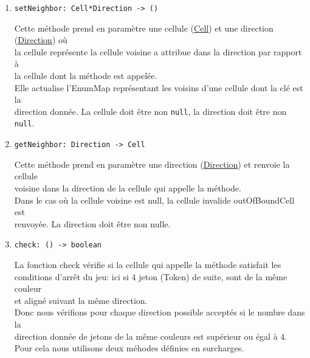 \documentclass[11pt]{article}
\begin{document}
\begin{enumerate}
\item \texttt{setNeighbor: Cell*Direction -> ()} \label{org45c9cd6}
\label{sec:org76b1234}

Cette méthode prend en paramètre une cellule (\hyperref[orgc81d8e8]{Cell}) et une direction (\hyperref[org010dbac]{Direction}) où\\
la cellule représente la cellule voisine a attribue dans la direction par rapport à\\
la cellule dont la méthode est appelée.\\

Elle actualise l'EnumMap représentant les voisins d'une cellule dont la clé est la\\
direction donnée. La cellule doit être non \texttt{null}, la direction doit être non \texttt{null}.\\

\item \texttt{getNeighbor: Direction -> Cell} \label{org48fb67a}
\label{sec:orga799806}

Cette méthode prend en paramètre une direction (\hyperref[org010dbac]{Direction}) et renvoie la cellule\\
voisine dans la direction de la cellule qui appelle la méthode.\\

Dans le cas où la cellule voisine est null, la cellule invalide outOfBoundCell est\\
renvoyée. La direction doit être non nulle.\\

\item \texttt{check: () -> boolean}
\label{sec:orgb9fea08}

La fonction check vérifie si la cellule qui appelle la méthode satisfait les\\
conditions d'arrêt du jeu: ici si 4 jeton (Token) de suite, sont de la même couleur\\
et aligné suivant la même direction.\\

Donc nous vérifions pour chaque direction possible acceptés si le nombre dans la\\
direction donnée de jetons de la même couleurs est supérieur ou égal à 4.\\

Pour cela nous utilisons deux méhodes définies en surcharges.\\


\end{enumerate}
\end{document}
